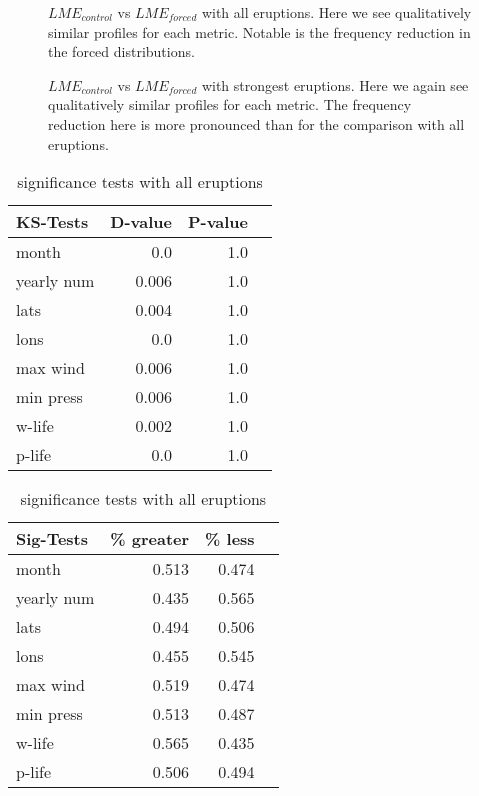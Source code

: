 \begin{figure}[!tbp]
\centering
\caption{$LME_{control}$ vs $LME_{forced}$ with all eruptions. Here we see qualitatively similar profiles for each metric. Notable is the frequency reduction in the forced distributions. }
\label{50_erups}
\end{figure}

\begin{figure}[!tbp]
\centering
\caption{$LME_{control}$ vs $LME_{forced}$ with strongest eruptions. Here we again see qualitatively similar profiles for each metric. The frequency reduction here is more pronounced than for the comparison with all eruptions. }
\label{10_erups}
\end{figure}

\begin{table}[!tbp]
\centering
\begin{minipage}[b]{0.45\textwidth}
\begin{tabular}{lrrr}
\toprule
             KS-Tests &     D-value &      P-value\\
\midrule

month & 0.0 & 1.0 \\
yearly num & 0.006 & 1.0 \\
lats & 0.004 & 1.0 \\
lons & 0.0 & 1.0 \\
max wind & 0.006 & 1.0 \\
min press & 0.006 & 1.0 \\
w-life & 0.002 & 1.0 \\
p-life & 0.0 & 1.0 \\

\bottomrule
\end{tabular}
\caption{ks-tests with all eruptions}
\label{ks_all}
\end{minipage}
\hfill
\begin{minipage}[b]{0.45\textwidth}
\begin{tabular}{lrrr}
\toprule
             Sig-Tests & \% greater &  \% less \\
\midrule

month & 0.513 & 0.474 \\
yearly num & 0.435 & 0.565 \\
lats & 0.494 & 0.506 \\
lons & 0.455 & 0.545 \\
max wind & 0.519 & 0.474 \\
min press & 0.513 & 0.487 \\
w-life & 0.565 & 0.435 \\
p-life & 0.506 & 0.494 \\

\bottomrule
\end{tabular}
\caption{significance tests with all eruptions}
\label{sig_all}
\end{minipage}
\end{table}

